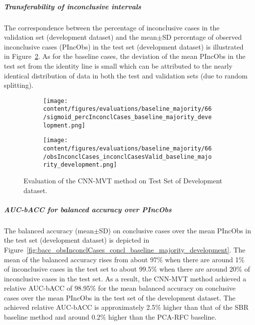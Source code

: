 \subparagraph{Transferability of inconclusive intervals}

The correspondence between the percentage of inconclusive cases in the validation set (development dataset) and 
the mean$\pm$SD percentage of observed inconclusive cases (PIncObs) in the test set (development dataset) 
is illustrated in Figure~\ref{fig:obsInconclCases_inconclCasesValid_baseline_majority_development}.
As for the baseline cases, the deviation of the mean PIncObs in the test set from the 
identity line is small which can be attributed to the nearly identical distribution of data in both the test and validation sets 
(due to random splitting).


\begin{figure}[ht]
  \begin{subfigure}{0.48\textwidth}
    \centering
    \texttt{[image: content/figures/evaluations/baseline\_majority/66/sigmoid\_percInconclCases\_baseline\_majority\_development.png]}
    \label{fig:baseline_majority_percInconclCases_development}
  \end{subfigure}
  \hfill
  \begin{subfigure}{0.495\textwidth}
    \centering
    \texttt{[image: content/figures/evaluations/baseline\_majority/66/obsInconclCases\_inconclCasesValid\_baseline\_majority\_development.png]}
    \label{fig:obsInconclCases_inconclCasesValid_baseline_majority_development}
  \end{subfigure}

  \caption{Evaluation of the CNN-MVT method on Test Set of Development dataset.}
  \label{fig:eval_cnn_mvt_dev}
\end{figure}


\subparagraph{AUC-bACC for balanced accuracy over PIncObs}

The balanced accuracy (mean$\pm$SD) on conclusive cases over the mean PIncObs
in the test set (development dataset) 
is depicted in Figure~\ref{fig:bacc_obsInconclCases_concl_baseline_majority_development}.
The mean of the balanced accuracy rises from about 97\% 
when there are around 1\% of inconclusive cases in the test set to about 99.5\% 
when there are around 20\% of inconclusive cases in the test set.
As a result, the CNN-MVT method achieved a relative AUC-bACC of 98.95\% for the mean balanced accuracy on conclusive cases
over the mean PIncObs in the test set of the development dataset.
The achieved relative AUC-bACC is approximately 2.5\% higher than that of the SBR baseline method 
and around 0.2\% higher than the PCA-RFC baseline.


